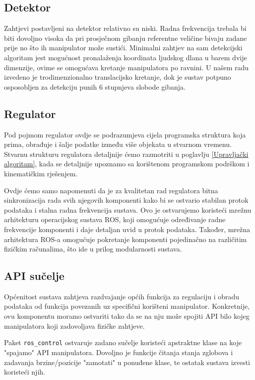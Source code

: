 \documentclass[times, utf8, diplomski, numeric]{fer}
\begin{document}
\subsection{Detektor}
Zahtjevi postavljeni na detektor relativno su niski. 
Radna frekvencija trebala bi biti dovoljno visoka da pri prosječnom gibanju referentne veličine bivaju zadane prije no što ih manipulator može sustići.
Minimalni zahtjev na sam detekcijski algoritam jest mogućnost pronalaženja koordinata ljudskog dlana u barem dvije dimenzije, ovime se omogućava kretanje manipulatora po ravnini.
U našem radu izvedeno je trodimenzionalno translacijsko kretanje, dok je sustav potpuno osposobljen za detekciju punih 6 stupnjeva slobode gibanja.

\subsection{Regulator}
Pod pojmom regulator ovdje se podrazumjeva cijela programska struktura koja prima, obrađuje i šalje podatke između više objekata u stvarnom vremenu.
Stvarnu strukturu regulatora detaljnije ćemo razmotriti u poglavlju \ref{Upravljački algoritam}, kada se detaljnije upoznamo sa korištenom programskom podrškom i kinematičkim rješenjem.

Ovdje ćemo samo napomenuti da je za kvalitetan rad regulatora bitna sinkronizacija rada svih njegovih komponenti kako bi se ostvario stabilan protok podataka i stalna radna frekvencija sustava.
Ovo je ostvarujemo koristeći mrežnu arhitekturu operacijskog sustava ROS, koji omogućuje određivanje radne frekvencije komponenti i daje detaljan uvid u protok podataka.
Također, mrežna arhitektura ROS-a omogućuje pokretanje komponenti pojedinačno na različitim fizičkim računalima, što ide u prilog modularnosti sustava.

\subsection{API sučelje}
Općenitost sustava zahtjeva razdvajanje općih funkcija za regulaciju i obradu podataka od funkcija povezanih uz specifični korišteni manipulator.
Konkretnije, ovu komponentu moramo ostvariti tako da se na nju može spojiti API bilo kojeg manipulatora koji zadovoljava fizičke zahtjeve.

Paket \verb|ros_control| ostvaruje zadano sučelje koristeći apstraktne klase na koje "spajamo" API manipulatora.
Dovoljno je funkcije čitanja stanja zglobova i zadavanja brzine/pozicije "zamotati" u ponuđene klase, te ostatak sustava izvesti koristeći njih.
\end{document}
